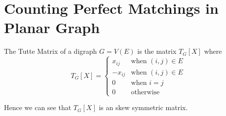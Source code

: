\section{Counting Perfect Matchings in Planar Graph}

\begin{definition}
	The Tutte Matrix of a digraph $G=V(E)$ is the matrix $T_G[X]$ where $$T_G[X]=\begin{cases}
		x_{ij}&\text{when $(i,j)\in E$}\\
		-x_{ij}&\text{when $(i,j)\in E$}\\
		0 & \text{when $i=j$}\\
		0&\text{otherwise}
	\end{cases}$$
\end{definition}
Hence we can see that $T_G[X]$ is an skew symmetric matrix.


